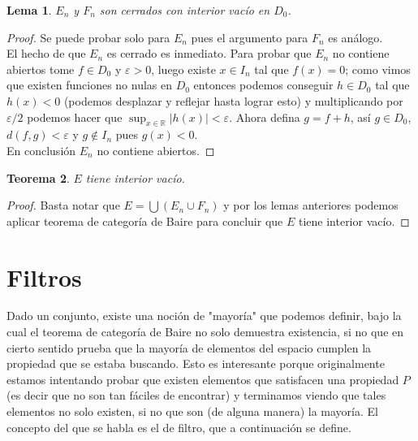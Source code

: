 \documentclass{article}
\newtheorem{theorem}{Teorema}[section]
\newtheorem{lemma}[theorem]{Lema}
\theoremstyle{definition}
\newcommand{\R}{\mathbb{R}}
\begin{document}
\begin{lemma}
$E_n$ y $F_n$ son cerrados con interior vacío en $D_0$. 
\end{lemma}
\begin{proof}
Se puede probar solo para $E_n$ pues el argumento para $F_n$ es análogo.\\
El hecho de que $E_n$ es cerrado es inmediato. Para probar que $E_n$ no contiene abiertos tome $f\in D_0$ y $\varepsilon >0$, luego existe $x\in I_n$ tal que $f(x)=0$; como vimos que existen funciones no nulas en $D_0$ entonces podemos conseguir $h\in D_0$ tal que $h(x)<0$ (podemos desplazar y reflejar hasta lograr esto) y multiplicando por $\varepsilon/2$ podemos hacer que $\sup_{x\in \R}  |h(x)|<\varepsilon$.
Ahora defina $g=f+h$, así $g\in D_0$, $d(f,g)<\varepsilon$ y $g\not\in I_n$ pues $g(x)<0$.\\
En conclusión $E_n$ no contiene abiertos.


  
\end{proof}
\begin{theorem}
$E$ tiene interior vacío.
\end{theorem}
\begin{proof}
Basta notar que $E=\bigcup (E_n\cup F_n)$ y por los lemas anteriores podemos aplicar teorema de categoría de Baire para concluir que $E$ tiene interior vacío.
\end{proof}




\section{Filtros}
Dado un conjunto, existe una noción de "mayoría" que podemos definir, bajo la cual el teorema de categoría de Baire no solo demuestra existencia, si no que en cierto sentido prueba que la mayoría de elementos del espacio cumplen la propiedad que se estaba buscando. Esto es interesante porque originalmente estamos intentando probar que existen elementos que satisfacen una propiedad $P$ (es decir que no son tan fáciles de encontrar) y terminamos viendo que tales elementos no solo existen, si no que son (de alguna manera) la mayoría. El concepto del que se habla es el de filtro, que a continuación se define.
\end{document}
